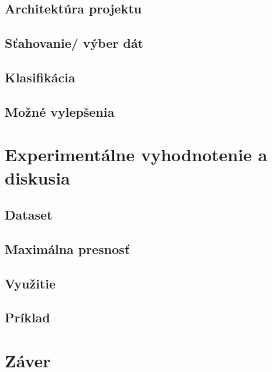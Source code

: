 \section{Architektúra projektu}


\section{Sťahovanie/ výber dát}


\section{Klasifikácia}


\section{Možné vylepšenia}


\chapter{Experimentálne vyhodnotenie a diskusia}
\label{experimenty}


\section{Dataset}


\section{Maximálna presnosť}


\section{Využitie}


\section{Príklad}


\chapter{Záver}
\label{zaver}





